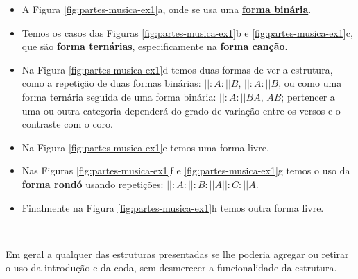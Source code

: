 \begin{itemize}
\item A Figura \ref{fig:partes-musica-ex1}a,
onde se usa uma \hyperref[subsec:formabinaria]{\textbf{forma binária}}.
\item Temos os casos das Figuras \ref{fig:partes-musica-ex1}b e \ref{fig:partes-musica-ex1}c,
que são \hyperref[subsec:formaternaria]{\textbf{forma ternárias}}, 
especificamente na \hyperref[subsec:formacancao]{\textbf{forma canção}}. 
\item Na Figura \ref{fig:partes-musica-ex1}d temos duas formas de ver a estrutura,
como a repetição de duas formas binárias: $||:A:||B$, $||:A:||B$, 
ou como uma forma ternária seguida de uma forma binária: $||:A:||BA$, $AB$;
pertencer a uma ou outra categoria dependerá do grado de variação entre os versos e o contraste com o coro.
\item Na Figura \ref{fig:partes-musica-ex1}e temos uma forma livre.
\item Nas Figuras \ref{fig:partes-musica-ex1}f e  \ref{fig:partes-musica-ex1}g temos o uso 
da \hyperref[subsec:formarondo]{\textbf{forma rondó}} usando repetições: $||:A:||:B:||A||:C:||A$.
\item Finalmente na Figura \ref{fig:partes-musica-ex1}h temos outra forma livre.
\end{itemize}~

Em geral a qualquer das estruturas presentadas se lhe poderia agregar ou retirar o uso da introdução e da coda,
sem desmerecer a funcionalidade da estrutura.
% 




